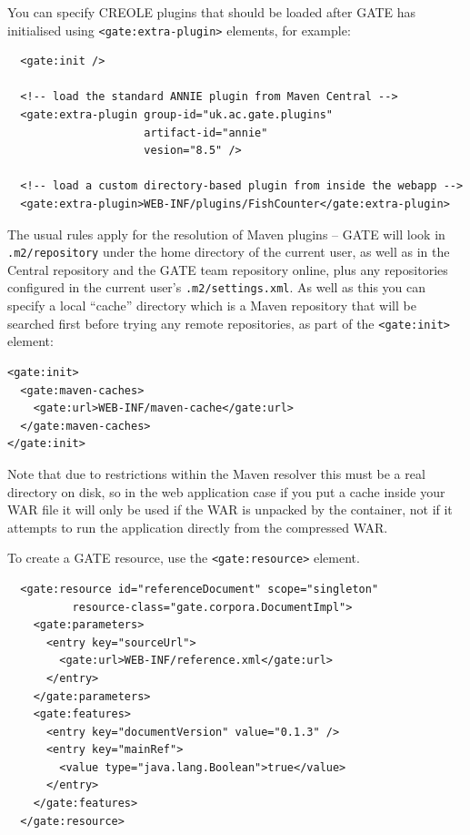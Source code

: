 You can specify CREOLE plugins that should be loaded after GATE has initialised
using \verb|<gate:extra-plugin>| elements, for example:
\begin{small}\begin{verbatim}
  <gate:init />

  <!-- load the standard ANNIE plugin from Maven Central -->
  <gate:extra-plugin group-id="uk.ac.gate.plugins"
                     artifact-id="annie"
                     vesion="8.5" />

  <!-- load a custom directory-based plugin from inside the webapp -->
  <gate:extra-plugin>WEB-INF/plugins/FishCounter</gate:extra-plugin>
\end{verbatim}\end{small}
%
The usual rules apply for the resolution of Maven plugins -- GATE will look in
\verb!.m2/repository! under the home directory of the current user, as well as
in the Central repository and the GATE team repository online, plus any
repositories configured in the current user's \verb!.m2/settings.xml!.  As well
as this you can specify a local ``cache'' directory which is a Maven repository
that will be searched first before trying any remote repositories, as part of
the \verb!<gate:init>! element:
\begin{small}\begin{verbatim}
<gate:init>
  <gate:maven-caches>
    <gate:url>WEB-INF/maven-cache</gate:url>
  </gate:maven-caches>
</gate:init>
\end{verbatim}\end{small}
%
Note that due to restrictions within the Maven resolver this must be a real
directory on disk, so in the web application case if you put a cache inside
your WAR file it will only be used if the WAR is unpacked by the container, not
if it attempts to run the application directly from the compressed WAR.

To create a GATE resource, use the \verb|<gate:resource>| element.
\begin{small}\begin{verbatim}
  <gate:resource id="referenceDocument" scope="singleton"
          resource-class="gate.corpora.DocumentImpl">
    <gate:parameters>
      <entry key="sourceUrl">
        <gate:url>WEB-INF/reference.xml</gate:url>
      </entry>
    </gate:parameters>
    <gate:features>
      <entry key="documentVersion" value="0.1.3" />
      <entry key="mainRef">
        <value type="java.lang.Boolean">true</value>
      </entry>
    </gate:features>
  </gate:resource>
\end{verbatim}\end{small}

